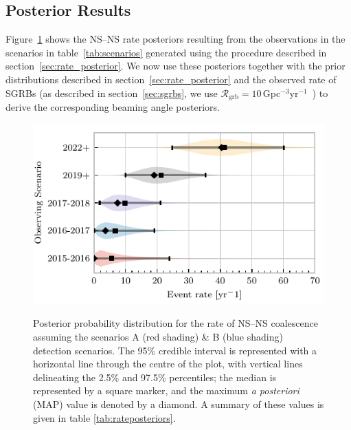\documentclass[twocolumn,nofootinbib]{revtex4-1}
\newcommand{\grbrate}{{{\mathcal R}_{\mathrm{grb}}}}
\newcommand{\cbcrate}{{{\mathcal R}}}
\newcommand{\latin}[1]{\textit{#1}}
\newcommand{\BNS}{\ac{NS}--\ac{NS}\xspace}
\begin{document}
\subsection{Posterior Results}
Figure~\ref{fig:aligorate} shows the \BNS rate posteriors resulting from
the observations in the scenarios in table~\ref{tab:scenarios}
generated using the procedure described in
section~\ref{sec:rate_posterior}.
We now use these posteriors together with the prior distributions
described in section~\ref{sec:rate_posterior} and the observed rate of
\acp{SGRB} (as described in section~\ref{sec:sgrbs}, we use
$\grbrate=10$\,Gpc$^{-3}$yr$^{-1}$~\cite{Nakar:2007yr,Dietz:2010eh})
to derive the corresponding beaming angle posteriors.

\begin{figure}
\centering
{\includegraphics[width=\linewidth]{rate_posteriors_violin.pdf}}
\caption{Posterior probability distribution for the rate of \BNS
  coalescence assuming the scenarios A (red shading) \& B (blue
  shading) detection scenarios. The 95\% credible interval is
  represented with a horizontal line through the centre of the plot,
  with vertical lines delineating the 2.5\% and 97.5\% percentiles;
  the median is represented by a square marker, and the maximum
  \latin{a posteriori} (\ac{MAP}) value is denoted by a diamond. A
  summary of these values is given in table
  \ref{tab:rateposteriors}. \label{fig:aligorate} }
\end{figure}
\end{document}
